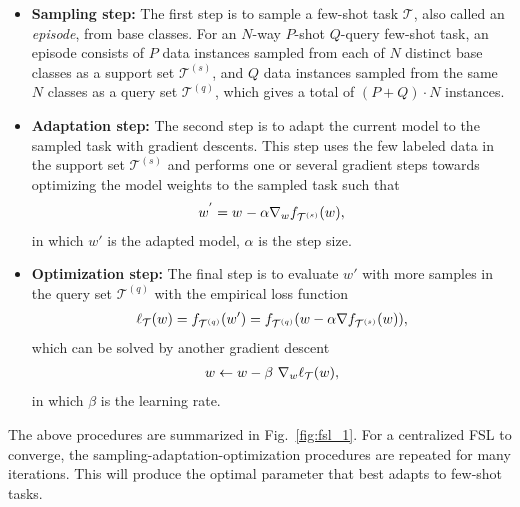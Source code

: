 \begin{itemize}[leftmargin=*]
\item \textbf{Sampling step:} The first step is to sample a few-shot task 
$\mathcal{T}$,  also called an \textit{episode}, from base classes. 
For an $N$-way $P$-shot $Q$-query few-shot task, an episode consists of $P$ data instances sampled from each of $N$ distinct base classes as a support set $\mathcal{T}^{(s)}$, and $Q$ data instances sampled from the same $N$ classes as a query set $\mathcal{T}^{(q)}$, which gives a total of $(P+Q) \cdot N$ instances.
\item \textbf{Adaptation step:} The second step is to adapt the current model to the sampled task with gradient descents. This step uses the few labeled data in the support set  $\mathcal{T}^{(s)}$ and performs one or several gradient steps towards optimizing the model weights to the sampled task such that
\begin{equation}\label{eq:adp}
\begin{split}
w^{'}_{} = w^{}_{}-\alpha \nabla_{w}f_{\mathcal{T}^{(s)}} (w),
\end{split}
\end{equation}
in which $w'$ is the adapted model, $\alpha$ is the step size. %
\item \textbf{Optimization step:} The final step is to evaluate $w'$ with more samples in the query set $\mathcal{T}^{(q)}$ with the empirical loss function
\begin{equation}
\begin{split}
\ell_\mathcal{T}(w) & =  f_{\mathcal{T}^{(q)}}(w')  = f_{\mathcal{T}^{(q)}}(w-\alpha \nabla f_{\mathcal{T}^{(s)}}(w)), \\
\end{split}
\label{eq:fed_def_adp_l1}
\end{equation}
which can be 
solved by another gradient descent
\begin{equation}
\begin{split}
w \leftarrow w -\beta \ \nabla_{w} \ell_\mathcal{T}(w),
\end{split}
\label{eq:fsl_sgd}
\end{equation}
in which $\beta$ is the learning rate.
\end{itemize}
The above procedures are summarized in Fig.~\ref{fig:fsl_1}.
For a centralized FSL to converge, the sampling-adaptation-optimization procedures are repeated for many iterations. This will produce the optimal parameter that best adapts to few-shot tasks. 

